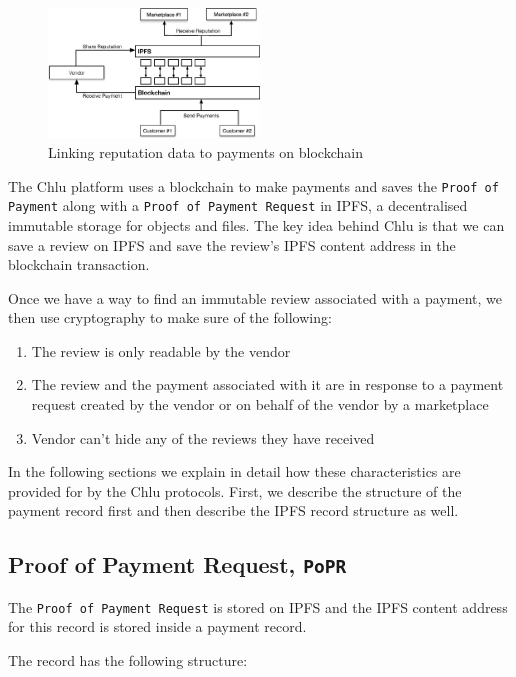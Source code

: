 \documentclass[a4paper]{article}
\begin{document}
\begin{figure}
\centering
\includegraphics[width=0.5\textwidth]{../reputation.eps}
\caption{\label{fig:reputation}Linking reputation data to payments on blockchain}
\end{figure}


The Chlu platform uses a blockchain to make payments and saves the
\texttt{Proof of Payment} along with a \texttt{Proof of Payment
  Request} in IPFS\cite{ipfs}, a decentralised immutable storage for
objects and files. The key idea behind Chlu is that we can save a
review on IPFS and save the review's IPFS content address in the
blockchain transaction.

Once we have a way to find an immutable review associated with a
payment, we then use cryptography to make sure of the following:

\begin{enumerate}
\item The review is only readable by the vendor
\item The review and the payment associated with it are in response to a payment request created by the vendor or on behalf of the vendor by a marketplace
\item Vendor can't hide any of the reviews they have received
\end{enumerate}

In the following sections we explain in detail how these
characteristics are provided for by the Chlu protocols.  First, we
describe the structure of the payment record first and then describe
the IPFS record structure as well.

\subsection{Proof of Payment Request, \texttt{PoPR}}
The \texttt{Proof of Payment Request} is stored on IPFS and the IPFS
content address for this record is stored inside a payment record.

The record has the following structure:
\end{document}
